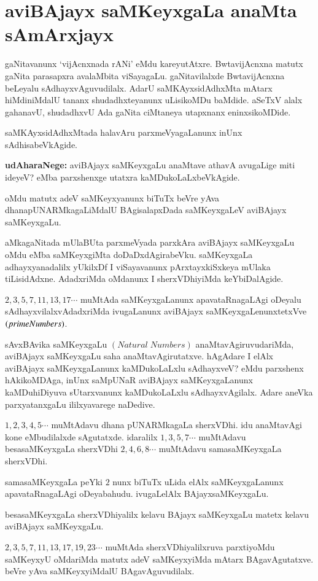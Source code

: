 \chapter{aviBAjayx saMKeyxgaLa anaMta sAmArxjayx}


gaNitavanunx `vijAcnxnada rANi' eMdu kareyutAtxre. BwtavijAcnxna matutx gaNita \-parasapxra avalaMbita viSayagaLu. gaNitavilalxde BwtavijAcnxna beLeyalu sAdhayxvAguvudilalx. AdarU saMKAyxsidAdhxMta mAtarx hiMdiniMdalU tananx shudadhxteyanunx uLisikoMDu baMdide. aSeTxV alalx gahanavU, shudadhxvU Ada gaNita ciMtaneya utapxnanx eninxsikoMDide.

saMKAyxsidAdhxMtada halavAru parxmeVyagaLanunx inUnx sAdhisabeVkAgide. 

\textbf{udAharaNege:} aviBAjayx saMKeyxgaLu anaMtave athavA avugaLige miti ideyeV? eMba parxshenxge utatxra kaMDukoLaLxbeVkAgide. 

oMdu matutx adeV saMKeyxyanunx biTuTx beVre yAva dhanapUNARMkagaLiMdalU BAgisalapxDada saMKeyxgaLeV aviBAjayx saMKeyxgaLu.

aMkagaNitada mUlaBUta parxmeVyada parxkAra aviBAjayx saMKeyxgaLu oMdu eMba saMKeyxgiMta doDaDxdAgirabeVku. saMKeyxgaLa adhayxyanadalilx yUkilxDf I viSayavanunx pArxtayxkiSxkeya mUlaka tiLisidAdxne. AdadxriMda oMdanunx I sherxVDhiyiMda keYbiDalAgide.
 
 $2,3,5,7,11,13,17\cdots$ muMtAda saMKeyxgaLanunx apavataRnagaLAgi oDe\break yalu sAdhayxvilalxvAdadxriMda ivugaLanunx aviBAjayx saMKeyxgaLenunxtetxVve $(prime\- Numbers)$.

sAvxBAvika saMKeyxgaLu $(Natural\; Numbers)$ anaMtavAgiruvudariMda, avi\-BAjayx saMKeyxgaLu saha anaMtavAgirutatxve. hAgAdare I elAlx aviBAjayx saMKeyxgaLanunx kaMDukoLaLxlu sAdhayxveV? eMdu parxshenx hAkikoMDAga, inUnx saMpUNaR aviBAjayx saMKeyxgaLanunx kaMDuhiDiyuva sUtarxvanunx kaMDukoLaLxlu sAdhayxvAgilalx. Adare aneVka parxyatanxgaLu ililxyavarege naDedive.

$1,2,3,4,5\cdots$ muMtAdavu dhana pUNARMkagaLa sherxVDhi. idu anaMtavAgi kone eMbudilalxde sAgutatxde. idaralilx $1,3,5,7\cdots$ muMtAdavu besasaMKeyxgaLa sherxVDhi $2,4,6,8\cdots$ muMtAdavu samasaMKeyxgaLa sherxVDhi.

samasaMKeyxgaLa peYki $2$ nunx biTuTx uLida elAlx saMKeyxgaLanunx apavataRnagaLAgi oDeyabahudu. ivugaLelAlx BAjayxsaMKeyxgaLu.

besasaMKeyxgaLa sherxVDhiyalilx kelavu BAjayx saMKeyxgaLu matetx kelavu aviBAjayx saMKeyx\-gaLu.

$2,3,5,7,11,13,17,19,23\cdots$ muMtAda sherxVDhiyalilxruva parxtiyoMdu saMKeyxyU oMdariMda matutx adeV saMKeyxyiMda mAtarx BAgavAgutatxve. beVre yAva saMKeyxyiMdalU BAgavAguvudilalx.

